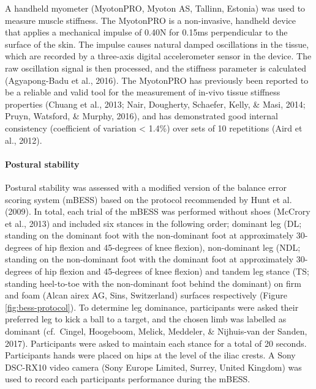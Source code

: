 \documentclass[man,floatsintext]{apa6}
\let\oldparagraph\paragraph
\renewcommand{\paragraph}[1]{\oldparagraph{#1}\mbox{}}
\begin{document}
A handheld myometer (MyotonPRO, Myoton AS, Tallinn, Estonia) was used to measure muscle stiffness.
The MyotonPRO is a non-invasive, handheld device that applies a mechanical impulse of 0.40N for 0.15ms perpendicular to the surface of the skin.
The impulse causes natural damped oscillations in the tissue, which are recorded by a three-axis digital accelerometer sensor in the device.
The raw oscillation signal is then processed, and the stiffness parameter is calculated (Agyapong-Badu et al., 2016).
The MyotonPRO has previously been reported to be a reliable and valid tool for the measurement of in-vivo tissue stiffness properties (Chuang et al., 2013; Nair, Dougherty, Schaefer, Kelly, \& Masi, 2014; Pruyn, Watsford, \& Murphy, 2016), and has demonstrated good internal consistency (coefficient of variation \textless{} 1.4\%) over sets of 10 repetitions (Aird et al., 2012).

\hypertarget{postural-stability}{%
\paragraph{Postural stability}\label{postural-stability}}

Postural stability was assessed with a modified version of the balance error scoring system (mBESS) based on the protocol recommended by Hunt et al. (2009).
In total, each trial of the mBESS was performed without shoes (McCrory et al., 2013) and included six stances in the following order; dominant leg (DL; standing on the dominant foot with the non-dominant foot at approximately 30-degrees of hip flexion and 45-degrees of knee flexion),
non-dominant leg (NDL; standing on the non-dominant foot with the dominant foot at approximately 30-degrees of hip flexion and 45-degrees of knee flexion)
and tandem leg stance (TS; standing heel-to-toe with the non-dominant foot behind the dominant) on firm and foam (Alcan airex AG, Sins, Switzerland) surfaces respectively (Figure \ref{fig:bess-protocol}).
To determine leg dominance, participants were asked their preferred leg to kick a ball to a target, and the chosen limb was labelled as dominant (cf.~Cingel, Hoogeboom, Melick, Meddeler, \& Nijhuis-van der Sanden, 2017).
Participants were asked to maintain each stance for a total of 20 seconds.
Participants hands were placed on hips at the level of the iliac crests.
A Sony DSC-RX10 video camera (Sony Europe Limited, Surrey, United Kingdom) was used to record each participants performance during the mBESS.
\end{document}
